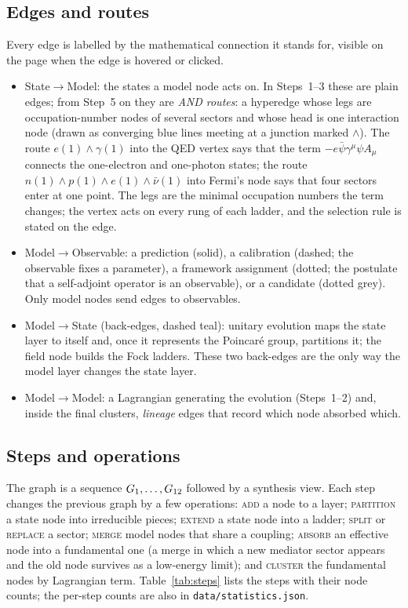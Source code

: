 \documentclass[11pt,a4paper]{article}
\newcommand{\lay}[1]{\textsf{#1}}
\begin{document}
\subsection{Edges and routes}
Every edge is labelled by the mathematical connection it stands for, visible on the page when the edge is hovered or clicked.
\begin{itemize}
\item \lay{State}$\to$\lay{Model}: the states a model node acts on. In Steps~1--3 these are plain edges; from Step~5 on they are \emph{AND routes}: a hyperedge whose legs are occupation-number nodes of several sectors and whose head is one interaction node (drawn as converging blue lines meeting at a junction marked $\wedge$). The route $e(1)\wedge\gamma(1)$ into the QED vertex says that the term $-e\bar\psi\gamma^\mu\psi A_\mu$ connects the one-electron and one-photon states; the route $n(1)\wedge p(1)\wedge e(1)\wedge\bar\nu(1)$ into Fermi's node says that four sectors enter at one point. The legs are the minimal occupation numbers the term changes; the vertex acts on every rung of each ladder, and the selection rule is stated on the edge.
\item \lay{Model}$\to$\lay{Observable}: a prediction (solid), a calibration (dashed; the observable fixes a parameter), a framework assignment (dotted; the postulate that a self-adjoint operator is an observable), or a candidate (dotted grey). Only model nodes send edges to observables.
\item \lay{Model}$\to$\lay{State} (back-edges, dashed teal): unitary evolution maps the state layer to itself and, once it represents the Poincaré group, partitions it; the field node builds the Fock ladders. These two back-edges are the only way the model layer changes the state layer.
\item \lay{Model}$\to$\lay{Model}: a Lagrangian generating the evolution (Steps~1--2) and, inside the final clusters, \emph{lineage} edges that record which node absorbed which.
\end{itemize}

\subsection{Steps and operations}
The graph is a sequence $G_1,\dots,G_{12}$ followed by a synthesis view. Each step changes the previous graph by a few operations: \textsc{add} a node to a layer; \textsc{partition} a state node into irreducible pieces; \textsc{extend} a state node into a ladder; \textsc{split} or \textsc{replace} a sector; \textsc{merge} model nodes that share a coupling; \textsc{absorb} an effective node into a fundamental one (a merge in which a new mediator sector appears and the old node survives as a low-energy limit); and \textsc{cluster} the fundamental nodes by Lagrangian term. Table~\ref{tab:steps} lists the steps with their node counts; the per-step counts are also in \texttt{data/statistics.json}.
\end{document}
